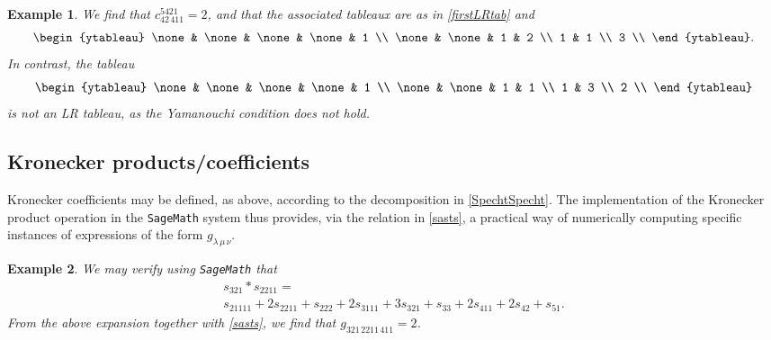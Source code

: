 \documentclass[12pt]{article}
\newtheorem{example}{Example}
\begin{document}
\begin{example}
 We find that $ c^{5421}_{42 \, 411} = 2$, and that the associated tableaux are as in \eqref{firstLRtab} and 
\begin{equation*}
 \begin{ytableau}
 \none & \none & \none & \none & 1 \\
\none & \none & 1 & 2 \\
1 & 1 \\ 
 3 \\ 
\end{ytableau}.
\end{equation*}
 In contrast, the tableau 
\begin{equation*}
 \begin{ytableau}
 \none & \none & \none & \none & 1 \\
\none & \none & 1 & 1 \\
1 & 3 \\ 
 2 \\ 
\end{ytableau}
\end{equation*}
 is not an LR tableau, as the Yamanouchi condition does not hold. 
\end{example}

\subsection{Kronecker products/coefficients}
 Kronecker coefficients may be defined, as above, according to the decomposition in \eqref{SpechtSpecht}. The implementation of 
 the Kronecker product operation in the {\tt SageMath} system thus provides, via the relation in \eqref{sasts}, a practical way of 
 numerically computing specific instances of expressions of the form $g_{\lambda \, \mu \, \nu}$. 

\begin{example} 
 We may verify using {\tt SageMath} that 
\begin{multline*}
 s_{321} \ast s_{2211} = \\ 
 s_{21111} + 2 s_{2211} + s_{222} + 2 s_{3111} + 3 s_{321} + s_{33} + 2 s_{411} + 2 s_{42} + s_{51}. 
\end{multline*}
 From the above expansion together with \eqref{sasts}, we find that $ g_{ 321 \, 2211 \, 411} = 2$. 
\end{example} 
\end{document}
